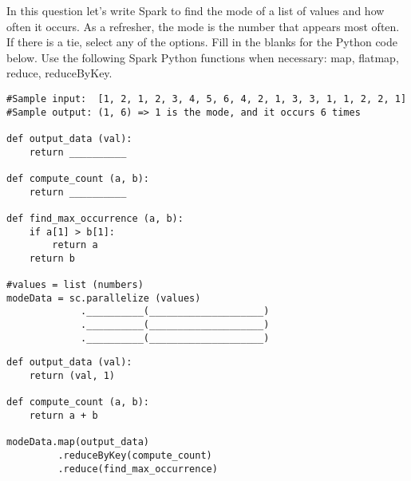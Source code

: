 \begin{blocksection}
\question
In this question let’s write Spark to find the mode of a list of values and how often it occurs. As a refresher, the mode is the number that appears most often. If there is a tie, select any of the options. Fill in the blanks for the Python code below.​ Use the following Spark Python functions when necessary: map​, flatmap​, reduce​, reduceByKey​. 

\begin{verbatim}
#Sample input:  [1​, 2, 1​, 2, 3, 4, 5, 6, 4, 2, 1,​ 3, 3, 1​, 1​, 2, 2, 1​]
#Sample output: (1, 6) => 1 is the mode, and it occurs 6 times

def output_data (val):
    return __________

def compute_count (a, b):
    return __________

def find_max_occurrence (a, b):
    if a[1] > b[1]: 
        return a 
    return b

#values = list (numbers) 
modeData = sc.parallelize (values)
			 .__________(____________________)
             .__________(____________________)
             .__________(____________________)
\end{verbatim}

\begin{solution}
\begin{verbatim}
def output_data (val):
    return (val, 1)

def compute_count (a, b):
    return a + b

modeData.map(output_data)
         .reduceByKey(compute_count)
         .reduce(find_max_occurrence)
\end{verbatim}

\end{solution}

\end{blocksection}